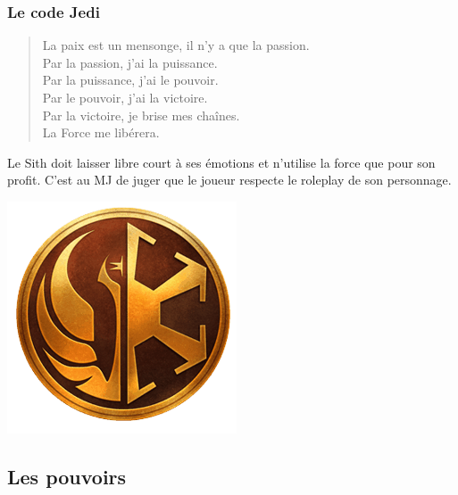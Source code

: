 \subsubsection{Le code Jedi}
\begin{quote}
La paix est un mensonge, il n’y a que la passion. \\
Par la passion, j’ai la puissance. \\
Par la puissance, j’ai le pouvoir. \\
Par le pouvoir, j’ai la victoire. \\
Par la victoire, je brise mes chaînes. \\
La Force me libérera.
\end{quote}

Le Sith doit laisser libre court à ses émotions et n’utilise la force que pour son profit. C’est au MJ de juger que le joueur respecte le roleplay de son personnage.

\begin{center}
	\vspace*{\fill}
	\includegraphics[width=0.9\linewidth]{img/pouvoirs/jedi-sith.png}
	\vspace*{\fill}
\end{center}

\clearpage
\subsection{Les pouvoirs}

